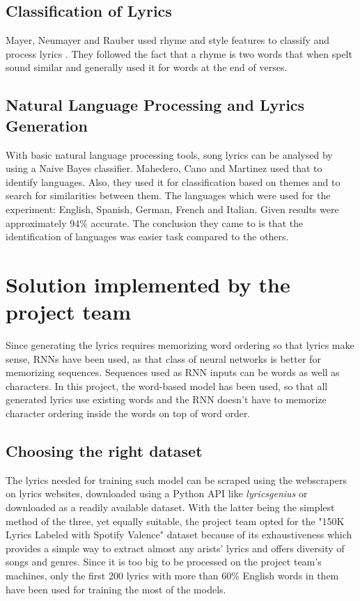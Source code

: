 \documentclass[conference]{IEEEtran}
\begin{document}
\subsection{Classification of Lyrics}
Mayer, Neumayer and Rauber used rhyme and style features to classify and process lyrics \cite{b6}. 
They followed the fact that a rhyme is two words that when spelt sound similar and generally used it for words at the end of verses.

\subsection{Natural Language Processing and Lyrics Generation}
With basic natural language processing tools, song lyrics can be analysed by using a Naive Bayes classifier. Mahedero, Cano and Martinez used that to 
identify languages. Also, they used it for classification based on themes and to search for similarities between them. 
The languages which were used for the experiment: English, Spanish, German, French and Italian. Given results were approximately 94\% accurate.
The conclusion they came to is that the identification of languages was easier task compared to the others.

\section{Solution implemented by the project team} %
Since generating the lyrics requires memorizing word ordering so that lyrics
make sense, RNNs have been used, as that class of neural networks is better for
memorizing sequences. Sequences used as RNN inputs can be words as well as
characters. In this project, the word-based model has been used, so that
all generated lyrics use existing words and the RNN doesn't have to memorize
character ordering inside the words on top of word order.

\subsection{Choosing the right dataset}
The lyrics needed for training such model can be scraped using the webscrapers
on lyrics websites, downloaded using a Python API like \textit{lyricsgenius} or
downloaded as a readily available dataset. With the latter being the simplest
method of the three, yet equally suitable, the project team opted for the
"150K Lyrics Labeled with Spotify Valence" dataset because of its exhaustiveness
which provides a simple way to extract almost any arists' lyrics and  offers
diversity of songs and genres. Since it is too big to be processed on the
project team's machines, only the first 200 lyrics with more than 60\% English
words in them have been used for training the most of the models.
\end{document}
